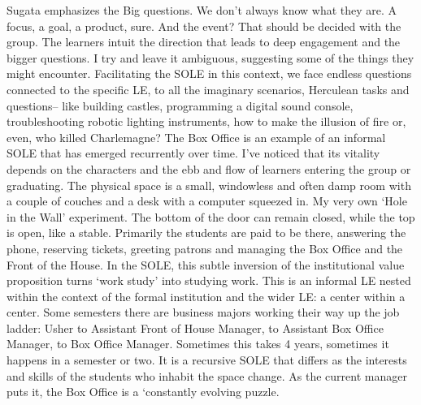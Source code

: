 Sugata emphasizes the Big questions. We don't always know what they are.
A focus, a goal, a product, sure. And the event? That should be decided
with the group. The learners intuit the direction that leads to deep
engagement and the bigger questions. I try and leave it ambiguous,
suggesting some of the things they might encounter. Facilitating the
SOLE in this context, we face endless questions connected to the
specific LE, to all the imaginary scenarios, Herculean tasks and
questions-- like building castles, programming a digital sound console,
troubleshooting robotic lighting instruments, how to make the illusion
of fire or, even, who killed Charlemagne? The Box Office is an example
of an informal SOLE that has emerged recurrently over time. I've noticed
that its vitality depends on the characters and the ebb and flow of
learners entering the group or graduating. The physical space is a
small, windowless and often damp room with a couple of couches and a
desk with a computer squeezed in. My very own `Hole in the Wall'
experiment. The bottom of the door can remain closed, while the top is
open, like a stable. Primarily the students are paid to be there,
answering the phone, reserving tickets, greeting patrons and managing
the Box Office and the Front of the House. In the SOLE, this subtle
inversion of the institutional value proposition turns `work study' into
studying work. This is an informal LE nested within the context of the
formal institution and the wider LE: a center within a center. Some
semesters there are business majors working their way up the job ladder:
Usher to Assistant Front of House Manager, to Assistant Box Office
Manager, to Box Office Manager. Sometimes this takes 4 years, sometimes
it happens in a semester or two. It is a recursive SOLE that differs as
the interests and skills of the students who inhabit the space change.
As the current manager puts it, the Box Office is a `constantly evolving
puzzle.

